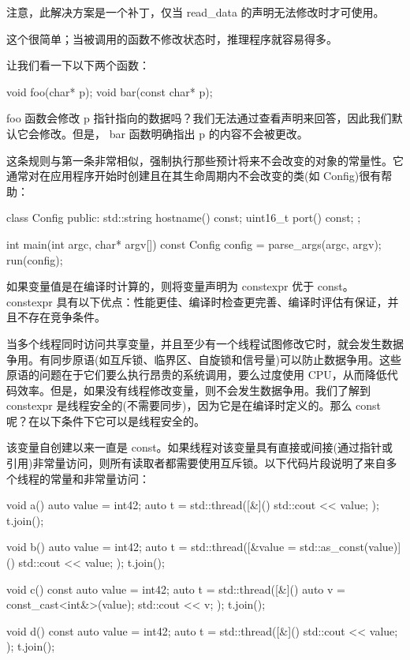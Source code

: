 注意，此解决方案是一个补丁，仅当 read\_data 的声明无法修改时才可使用。


这个很简单；当被调用的函数不修改状态时，推理程序就容易得多。

让我们看一下以下两个函数：

\begin{cpp}
void foo(char* p);
void bar(const char* p);
\end{cpp}

foo 函数会修改 p 指针指向的数据吗？我们无法通过查看声明来回答，因此我们默认它会修改。但是， bar 函数明确指出 p 的内容不会被更改。


这条规则与第一条非常相似，强制执行那些预计将来不会改变的对象的常量性。它通常对在应用程序开始时创建且在其生命周期内不会改变的类(如 Config)很有帮助：

\begin{cpp}
class Config {
public:
    std::string hostname() const;
    uint16_t port() const;
};

int main(int argc, char* argv[]) {
    const Config config = parse_args(argc, argv);
    run(config);
}
\end{cpp}


如果变量值是在编译时计算的，则将变量声明为 constexpr 优于 const。 constexpr 具有以下优点：性能更佳、编译时检查更完善、编译时评估有保证，并且不存在竞争条件。


当多个线程同时访问共享变量，并且至少有一个线程试图修改它时，就会发生数据争用。有同步原语(如互斥锁、临界区、自旋锁和信号量)可以防止数据争用。这些原语的问题在于它们要么执行昂贵的系统调用，要么过度使用 CPU，从而降低代码效率。但是，如果没有线程修改变量，则不会发生数据争用。我们了解到 constexpr 是线程安全的(不需要同步)，因为它是在编译时定义的。那么 const 呢？在以下条件下它可以是线程安全的。

该变量自创建以来一直是 const。如果线程对该变量具有直接或间接(通过指针或引用)非常量访问，则所有读取者都需要使用互斥锁。以下代码片段说明了来自多个线程的常量和非常量访问：

\begin{cpp}
void a() {
    auto value = int{42};
    auto t = std::thread([&]() { std::cout << value; });
    t.join();
}

void b() {
    auto value = int{42};
    auto t = std::thread([&value = std::as_const(value)]() {
        std::cout << value;
    });
    t.join();
}

void c() {
    const auto value = int{42};
    auto t = std::thread([&]() {
        auto v = const_cast<int&>(value);
        std::cout << v;
    });
    t.join();
}

void d() {
    const auto value = int{42};
    auto t = std::thread([&]() { std::cout << value; });
    t.join();
}
\end{cpp}

